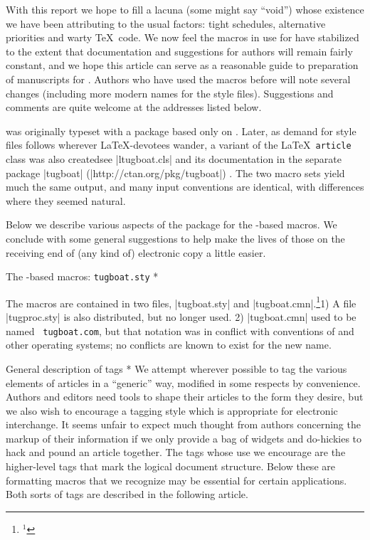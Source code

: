 \article

With this report we hope to fill a lacuna (some might say ``void'')
whose existence we have been attributing to the usual factors: tight
schedules, alternative priorities and warty \TeX\ code.  We now feel
the macros in use for \TUB\/ have stabilized to the extent that
documentation and suggestions for authors will remain fairly constant,
and we hope this article can serve as a reasonable guide to
preparation of manuscripts for \TUB.  Authors who have used the \TUB\/
macros before will note several changes (including more modern names
for the style files).  Suggestions and comments are quite welcome at
the addresses listed below.

\TUB\/ was originally typeset with a package based only on \plain.
Later, as demand for style files follows wherever \LaTeX-devotees
wander, a \TUB\/ variant of the \LaTeX\ {\tt article} class was also
created\Dash see |ltugboat.cls| and its documentation in the separate
package |tugboat| (|http://ctan.org/pkg/tugboat|) .  The two macro sets
yield much the same output, and many input conventions are identical,
with differences where they seemed natural.

Below we describe various aspects of the \TUB\/ package for the
\plain-based macros. We conclude with some general suggestions to help
make the lives of those on the receiving end of (any kind of) electronic
copy a little easier.


\head * The \plain-based macros: {\tt tugboat.sty} *

The macros are contained in two files, |tugboat.sty| and
|tugboat.cmn|.\footnote{$^1$}{1) A file |tugproc.sty| is also
distributed, but no longer used. 2) |tugboat.cmn| used to be named {\tt
tugboat.com}, but that notation was in conflict with conventions of
 and other operating systems; no conflicts are known to
exist for the new name.}

\subhead * General description of tags * We attempt wherever possible to
tag the various elements of \TUB\/ articles in a ``generic'' way,
modified in some respects by convenience.  Authors and editors need
tools to shape their articles to the form they desire, but we also wish
to encourage a tagging style which is appropriate for electronic
interchange.  It seems unfair to expect much thought from authors
concerning the markup of their information if we only provide a bag of
widgets and do-hickies to hack and pound an article together.  The tags
whose use we encourage are the higher-level tags that mark the logical
document structure.  Below these are formatting macros that we recognize
may be essential for certain applications.  Both sorts of tags are
described in the following article.

